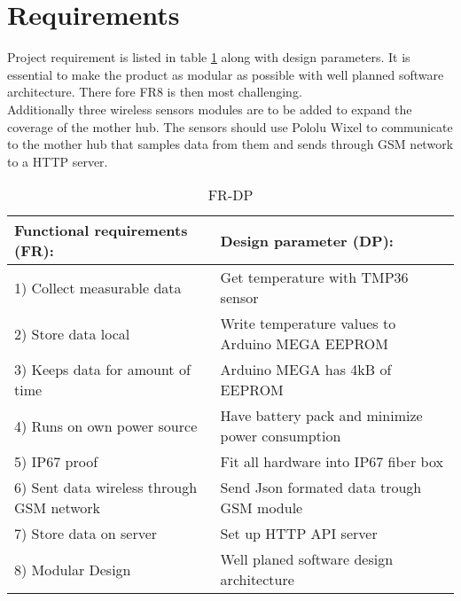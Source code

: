 \section{Requirements}\label{requirements}
Project requirement is listed in table \ref{tbl:FRDP} along with design parameters.
It is essential to make the product as modular as possible with well planned software architecture. There fore FR8 is then most challenging. \\
Additionally three wireless sensors modules are to be added to expand the coverage of the mother hub.  The sensors should use Pololu Wixel to communicate to the mother hub that samples data from them and sends through GSM network to a HTTP server.

\begin{table}[H]
	\caption{FR-DP}
	\label{tbl:FRDP}
\begin{tabular}{|p{8cm}|p{8cm}|}
		\hline \textbf{Functional requirements (FR):} & \textbf{Design parameter (DP):} \\ 
		\hline 1) Collect measurable data &   Get temperature with TMP36\cite{Devices2010} sensor\\
		\hline 2) Store data local &   Write temperature values to Arduino MEGA EEPROM \\
		\hline 3) Keeps data for amount of time &  Arduino MEGA \cite{arduinoMega} has 4kB of EEPROM \\
		\hline 4) Runs on own power source & Have battery pack and minimize power consumption \\ 
		\hline 5) IP67 proof &   Fit all hardware into IP67 fiber box\\
		\hline 6) Sent data wireless through GSM network & Send Json formated data trough GSM module \\ 
		\hline 7) Store data on server & Set up HTTP API server \\ 
		\hline 8) Modular Design & Well planed software design architecture \\ 
		\hline
	\end{tabular}
\end{table}